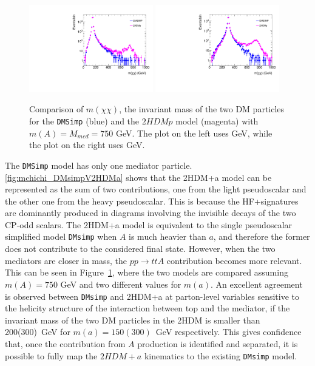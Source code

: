 \begin{figure}[htb]
\begin{center}
\includegraphics[width=0.48\textwidth]{texinputs/04_grid/figures/DMHF/mdd150.pdf}
\includegraphics[width=0.48\textwidth]{texinputs/04_grid/figures/DMHF/mdd300.pdf}
\caption{Comparison of $m(\chi\chi)$, the invariant mass of 
the two DM particles for the \texttt{DMSimp} (blue) and the $2HDMp$ model (magenta) with $m(A) = M_{med} = 750$ GeV. The plot on the left uses  GeV, while the plot on the right uses  GeV.}
\label{fig:mdd}
\end{center}
\end{figure}

The \texttt{DMSimp} model has only one mediator particle. \autoref{fig:mchichi_DMsimpV2HDMa} shows that the 2HDM+a model can be represented as the sum of two contributions, one from the light pseudoscalar and the other one from the heavy pseudoscalar. This is because the HF+\MET signatures are dominantly produced in diagrams involving the invisible decays of the two CP-odd scalars. The 2HDM+a model is equivalent to the single pseudoscalar simplified model \texttt{DMsimp} when $A$ is much heavier than $a$, and therefore the former does not contribute to the considered final state. However, when the two mediators are closer in mass, the $pp\rightarrow ttA$ contribution becomes more relevant. This can be seen in Figure~\ref{fig:mdd}, where the two models are compared assuming $m(A) = 750$ GeV and two different values for $m(a)$. An excellent agreement is observed between \texttt{DMsimp} and 2HDM+a at parton-level variables sensitive to the helicity structure of the interaction between top and the mediator\cite{Haisch:2016gry}, if the invariant mass of the two DM particles in the 2HDM is smaller than 200(300)~GeV for $m(a)=150(300)$~GeV respectively. This gives confidence that, once the contribution from $A$ production is identified and separated, it is possible to fully map the $2HDM+a$ kinematics to the existing \texttt{DMsimp} model. 


